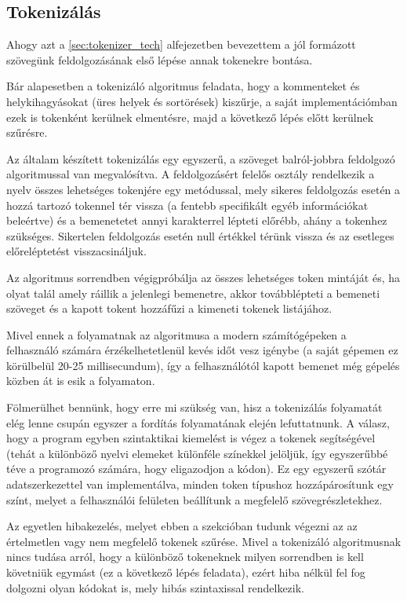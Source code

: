 \subsection{Tokenizálás}
\label{sec:tokenizer}

Ahogy azt a \ref{sec:tokenizer_tech} alfejezetben bevezettem a jól formázott szövegünk feldolgozásának első lépése annak tokenekre bontása.

Bár alapesetben a tokenizáló algoritmus feladata, hogy a kommenteket és helykihagyásokat (üres helyek és sortörések) kiszűrje, a saját implementációmban ezek is tokenként kerülnek elmentésre, majd a következő lépés előtt kerülnek szűrésre.

Az általam készített tokenizálás egy egyszerű, a szöveget balról-jobbra feldolgozó algoritmussal van megvalósítva. A feldolgozásért felelős osztály rendelkezik a nyelv összes lehetséges tokenjére egy metódussal, mely sikeres feldolgozás esetén a hozzá tartozó tokennel tér vissza (a fentebb specifikált egyéb információkat beleértve) és a bemenetetet annyi karakterrel lépteti előrébb, ahány a tokenhez szükséges. Sikertelen feldolgozás esetén null értékkel térünk vissza és az esetleges előreléptetést visszacsináljuk.

Az algoritmus sorrendben végigpróbálja az összes lehetséges token mintáját és, ha olyat talál amely ráillik a jelenlegi bemenetre, akkor továbblépteti a bemeneti szöveget és a kapott tokent hozzáfűzi a kimeneti tokenek listájához.

Mivel ennek a folyamatnak az algoritmusa a modern számítógépeken a felhasználó számára érzékelhetetlenül kevés időt vesz igénybe (a saját gépemen ez körülbelül 20-25 millisecundum), így a felhasználótól kapott bemenet még gépelés közben át is esik a folyamaton. 

Fölmerülhet bennünk, hogy erre mi szükség van, hisz a tokenizálás folyamatát elég lenne csupán egyszer a fordítás folyamatának elején lefuttatnunk. A válasz, hogy a program egyben szintaktikai kiemelést is végez a tokenek segítségével (tehát a különböző nyelvi elemeket különféle színekkel jelöljük, így egyszerűbbé téve a programozó számára, hogy eligazodjon a kódon). Ez egy egyszerű szótár adatszerkezettel van implementálva, minden token típushoz hozzápárosítunk egy színt, melyet a felhasználói felületen beállítunk a megfelelő szövegrészletekhez.

Az egyetlen hibakezelés, melyet ebben a szekcióban tudunk végezni az az értelmetlen vagy nem megfelelő tokenek szűrése. Mivel a tokenizáló algoritmusnak nincs tudása arról, hogy a különböző tokeneknek milyen sorrendben is kell követniük egymást (ez a következő lépés feladata), ezért hiba nélkül fel fog dolgozni olyan kódokat is, mely hibás szintaxissal rendelkezik.


